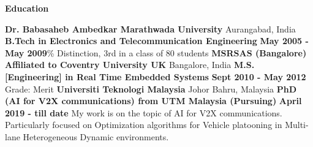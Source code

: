 \begin{center}
    \textbf{Education}
\end{center}

\textbf{Dr. Babasaheb Ambedkar Marathwada University}   \hfill{Aurangabad, India}\newline
\textbf{B.Tech in Electronics and Telecommunication Engineering} \hfill\textbf{May 2005 - May 2009}\% Distinction, 3rd in a class of 80 students
\vspace{12pt}
\newline
\textbf{MSRSAS (Bangalore) Affiliated to Coventry University UK}    \hfill{Bangalore, India}\newline
\textbf{M.S. [Engineering] in Real Time Embedded Systems} \hfill\textbf{Sept 2010 - May 2012}\newline
Grade: Merit
\vspace{12pt}
\newline
\textbf{Universiti Teknologi Malaysia}  \hfill{Johor Bahru, Malaysia }\newline
\textbf{PhD (AI for V2X communications) from UTM Malaysia (Pursuing)} \hfill \textbf{April 2019 - till date}\newline
My work is on the topic of AI for V2X communications. Particularly focused on Optimization algorithms for Vehicle
platooning in Multi-lane Heterogeneous Dynamic environments.